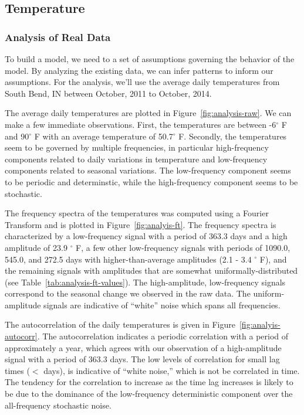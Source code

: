 \documentclass[11pt, letterpaper]{article}
\begin{document}
\subsection{Temperature}
\subsubsection{Analysis of Real Data} \label{sec:analysis}
To build a model, we need to a set of assumptions governing the behavior of the model.  By analyzing the existing data, we can infer patterns to inform our assumptions.  For the analysis, we'll use the average daily temperatures from South Bend, IN between October, 2011 to October, 2014.

The average daily temperatures are plotted in Figure~\ref{fig:analysis-raw}. We can make a few immediate observations.  First, the temperatures are between -6$^{\circ}$ F and 90$^{\circ}$ F with an average temperature of 50.7$^{\circ}$ F.  Secondly, the temperatures seem to be governed by multiple frequencies, in particular high-frequency components related to daily variations in temperature and low-frequency components related to seasonal variations.  The low-frequency component seems to be periodic and determinstic, while the high-frequency component seems to be stochastic.

The frequency spectra of the temperatures was computed using a Fourier Transform and is plotted in Figure~\ref{fig:analyis-ft}.  The frequency spectra is characterized by a low-frequency signal with a period of 363.3 days and a high amplitude of 23.9 $^{\circ}$ F, a few other low-frequency signals with periods of 1090.0, 545.0, and 272.5 days with higher-than-average amplitudes (2.1 - 3.4 $^{\circ}$ F), and the remaining signals with amplitudes that are somewhat uniformally-distributed (see Table~\ref{tab:analysis-ft-values}).  The high-amplitude, low-frequency signals correspond to the seasonal change we observed in the raw data.  The uniform-amplitude signals are indicative of ``white'' noise which spans all frequencies. 

The autocorrelation of the daily temperatures is given in Figure~\ref{fig:analyis-autocorr}.  The autocorrelation indicates a periodic correlation with a period of approximately a year, which agrees with our observation of a high-amplitude signal with a period of 363.3 days.  The low levels of correlation for small lag times ($<$ days), is indicative of ``white noise,'' which is not be correlated in time. The tendency for the correlation to increase as the time lag increases is likely to be due to the dominance of the low-frequency deterministic component over the all-frequency stochastic noise.
\end{document}
